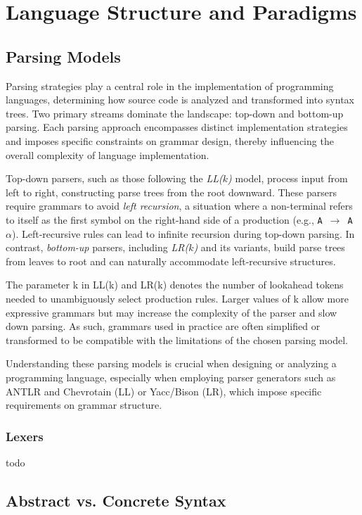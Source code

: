 \section{Language Structure and Paradigms}

\subsection{Parsing Models}

Parsing strategies play a central role in the implementation of programming languages, determining how source code is analyzed and transformed into syntax trees.
Two primary streams dominate the landscape: top-down and bottom-up parsing. Each parsing approach encompasses distinct implementation strategies and imposes specific
constraints on grammar design, thereby influencing the overall complexity of language implementation.

Top-down parsers, such as those following the \textit{LL($k$)} model, process input from left to right, constructing parse trees from the root downward.
These parsers require grammars to avoid \textit{left recursion}, a situation where a non-terminal refers to itself as the first symbol on the right-hand side of a
production (e.g., \texttt{A}~$\rightarrow$~\texttt{A}~$\alpha$). Left-recursive rules can lead to infinite recursion during top-down parsing.
In contrast, \textit{bottom-up} parsers, including \textit{LR($k$)} and its variants, build parse trees from leaves to root and can naturally accommodate
left-recursive structures.

The parameter k in LL(k) and LR(k) denotes the number of lookahead tokens needed to unambiguously select production rules.
Larger values of k allow more expressive grammars but may increase the complexity of the parser and slow down parsing.
As such, grammars used in practice are often simplified or transformed to be compatible with the limitations of the chosen parsing model.

Understanding these parsing models is crucial when designing or analyzing a programming language, especially when employing parser generators such as
ANTLR and Chevrotain (LL) or Yacc/Bison (LR), which impose specific requirements on grammar structure.

\subsubsection*{Lexers}
todo

\subsection{Abstract vs. Concrete Syntax}

